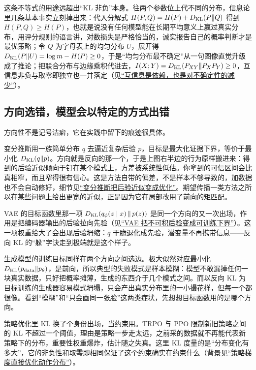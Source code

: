 这条不等式的用途远超出``KL 非负''本身。往两个参数位上代不同的分布，信息论里几条基本事实立刻掉出来：代入分解式 \(H(P,Q)=H(P)+D_{\mathrm{KL}}(P\|Q)\) 得到 \(H(P,Q)\ge H(P)\)，也就是说没有任何模型能在长期平均意义上赢过真实分布，用评分规则的语言讲，对数损失是严格恰当的，诚实报告自己的概率判断才是最优策略；令 \(Q\) 为字母表上的均匀分布 \(U\)，展开得 \(D_{\mathrm{KL}}(P\|U)=\log m-H(P)\ge 0\)，于是``均匀分布最不确定''从一句图像直觉升级成了推论；把联合分布与边缘乘积代进去，\(I(X;Y)=D_{\mathrm{KL}}(P_{XY}\|P_XP_Y)\ge 0\)，互信息非负与取零即独立也一并落定（见\hyperref[sec:07-Information-Theory/02-Joint-Information/02]{``互信息是依赖，也是对不确定性的减少''}）。

\subsection{方向选错，模型会以特定的方式出错}

方向性不是记号洁癖，它在实践中留下的痕迹很具体。

变分推断用一族简单分布 \(q\) 去逼近复杂后验 \(p\)，目标是最大化证据下界，等价于最小化 \(D_{\mathrm{KL}}(q\|p)\)。方向就是反向的那一个，于是上图右半边的行为原样搬进来：得到的后验近似倾向于钉在某个模式上，方差被系统性低估。你拿到的可信区间会比真相窄，而且窄得很有信心。这是方法自带的偏差，不是样本不够导致的，加数据也不会自动修好，细节见\hyperref[sec:13-Machine-Learning/08-Sampling-and-Inference/03]{``变分推断把后验近似变成优化''}。期望传播一类方法之所以在某些问题上给出更宽的近似，正是因为它在局部改用了前向的矩匹配。

VAE 的目标函数里那一项 \(D_{\mathrm{KL}}(q_\phi(z\mid x)\,\|\,p(z))\) 是同一个方向的又一次出场，作用是把编码器输出的后验拉向先验（见\hyperref[sec:14-Deep-Learning/06-Variational-Autoencoders/01]{``VAE 把不可积后验变成可训练下界''}）。这一项权重给大了会出现后验坍缩：\(q\) 干脆退化成先验，潜变量不再携带信息——反向 KL 的``躲''字诀走到极端就是这个样子。

生成模型的训练目标同样在两个方向之间选边。极大似然对应最小化 \(D_{\mathrm{KL}}(p_{\text{data}}\|p_\theta)\)，是前向，所以典型的失败模式是样本模糊：模型不敢漏掉任何一块真实数据，只好把概率摊薄，生成的东西介于几个模式之间。而以反向 KL 为目标训练的生成器容易模式坍塌，只会产出真实分布里的一小撮花样，但每一个都很像。看到``模糊''和``只会画同一张脸''这两类症状，先想想目标函数用的是哪个方向。

策略优化里 KL 换了个身份出场，当约束用。TRPO 与 PPO 限制新旧策略之间的 KL 不超过一个阈值，理由是策略一步走太远，之前采的数据就不再能代表新策略下的分布，重要性权重爆炸，估计随之失真。这里 KL 度量的是``分布变化有多大''，它的非负性和取零即相同保证了这个约束确实在约束什么（背景见\hyperref[sec:16-Control-and-Reinforcement-Learning/02-Reinforcement-Learning/09]{``策略梯度直接优化动作分布''}）。

